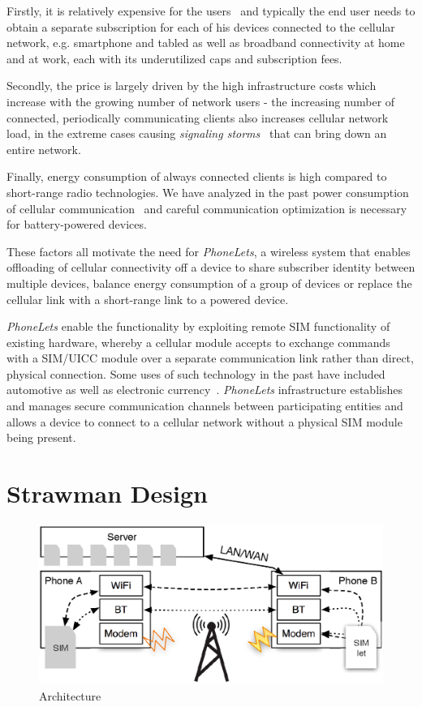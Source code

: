 \documentclass{sig-alternate-10pt}
\begin{document}
Firstly, it is relatively expensive for the users~\cite{Anonymous:2013ut} and typically the end user needs to obtain a separate subscription for each of his devices connected to the cellular network, e.g. smartphone and tabled as well as broadband connectivity at home and at work, each with its underutilized caps and subscription fees.

Secondly, the price is largely driven by the high infrastructure costs which increase with the growing number of network users - the increasing number of connected, periodically communicating clients also increases cellular network load, in the extreme cases causing \emph{signaling storms}~\cite{Yang:wh} that can bring down an entire network.

Finally, energy consumption of always connected clients is high compared to short-range radio technologies. We have analyzed in the past power consumption of cellular communication~\cite{Aucinas:2013uk} and careful communication optimization is necessary for battery-powered devices.

These factors all motivate the need for \emph{PhoneLets}, a wireless system that enables offloading of cellular connectivity off a device to share subscriber identity between multiple devices, balance energy consumption of a group of devices or replace the cellular link with a short-range link to a powered device.

\emph{PhoneLets} enable the functionality by exploiting remote SIM functionality of existing hardware, whereby a cellular module accepts to exchange commands with a SIM/UICC module over a separate communication link rather than direct, physical connection. Some uses of such technology in the past have included automotive as well as electronic currency~\cite{subramanian2003sim}. \emph{PhoneLets} infrastructure establishes and manages secure communication channels between participating entities and allows a device to connect to a cellular network without a physical SIM module being present.


\section{Strawman Design}

\begin{figure}
\centering
\includegraphics[width=0.9\columnwidth]{figs/arch}
\vspace{-3mm}
\caption{Architecture}
\label{fig:arch}
\vspace{-2mm}
\end{figure}
\end{document}

